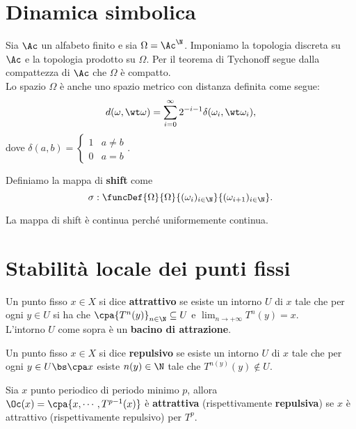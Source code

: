 \section{Dinamica simbolica}
Sia $\Ac$ un alfabeto finito e sia $\Omega=\Ac^\N$. Imponiamo la topologia discreta su $\Ac$ e la topologia prodotto su $\Omega$. Per il teorema di Tychonoff segue dalla compattezza di $\Ac$ che $\Omega$ \`e compatto.\\
Lo spazio $\Omega$ \`e anche uno spazio metrico con distanza definita come segue:
\[d(\omega,\wt \omega)=\sum_{i=0}^\infty 2^{-i-1}\delta(\omega_i,\wt \omega_i),\]
dove $\delta(a,b)=\begin{cases}
1 & a\neq b\\
0 & a=b
\end{cases}$.

\begin{definition}[Shift]
Definiamo la mappa di \textbf{shift} come
\[\sigma:\funcDef{\Omega}{\Omega}{(\omega_i)_{i\in\N}}{(\omega_{i+1})_{i\in\N}}.\]
\end{definition}
\begin{remark}
La mappa di shift \`e continua perch\'e uniformemente continua.
\end{remark}

\section{Stabilit\`a locale dei punti fissi}
\begin{definition}
Un punto fisso $x\in X$ si dice \textbf{attrattivo} se esiste un intorno $U$ di $x$ tale che per ogni $y\in U$ si ha che $\cpa{T^n(y)}_{n\in\N}\subseteq U$ e $\displaystyle\lim_{n\to+\infty}T^n(y)=x$.\\
L'intorno $U$ come sopra \`e un \textbf{bacino di attrazione}.
\vspace{0.25cm}

\noindent
Un punto fisso $x\in X$ si dice \textbf{repulsivo} se esiste un intorno $U$ di $x$ tale che per ogni $y\in U\bs \cpa x$ esiste $n(y)\in\N$ tale che $T^{n(y)}(y)\notin U$.
\end{definition}

\begin{definition}
Sia $x$ punto periodico di periodo minimo $p$, allora $\Oc(x)=\cpa{x,\cdots, T^{p-1}(x)}$ \`e \textbf{attrattiva} (rispettivamente \textbf{repulsiva}) se $x$ \`e attrattivo (rispettivamente repulsivo) per $T^p$.
\end{definition}

